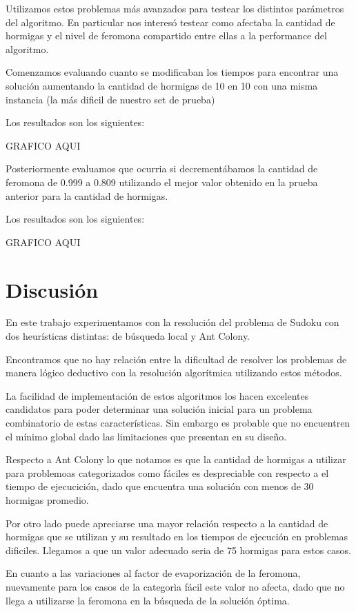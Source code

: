 \documentclass[a4paper,spanish]{article}
\begin{document}
Utilizamos estos problemas más avanzados para testear los distintos parámetros del algoritmo. En particular
nos interesó testear como afectaba la cantidad de hormigas y el nivel de feromona compartido entre ellas
a la performance del algoritmo.

Comenzamos evaluando cuanto se modificaban los tiempos para encontrar una solución aumentando 
la cantidad de hormigas de 10 en 10 con una misma instancia (la más dificil de nuestro set de prueba)

Los resultados son los siguientes:

GRAFICO AQUI

Posteriormente evaluamos que ocurria si decrementábamos la cantidad de feromona de 0.999 a 0.809 utilizando
el mejor valor obtenido en la prueba anterior para la cantidad de hormigas.

Los resultados son los siguientes:

GRAFICO AQUI


\section{Discusión}

En este trabajo experimentamos con la resolución del problema de Sudoku con dos
heurísticas distintas: de búsqueda local y Ant Colony.


Encontramos que no hay relación entre la dificultad de resolver los problemas de
manera lógico deductivo con la resolución algorítmica utilizando estos métodos.

La facilidad de implementación de estos algoritmos los hacen excelentes
candidatos para poder determinar una solución inicial para un problema
combinatorio de estas características. Sin embargo es probable que no encuentren
el mínimo global dado las limitaciones que presentan en su diseño.


Respecto a Ant Colony lo que notamos es que la cantidad de hormigas a utilizar para problemoas categorizados como
fáciles es despreciable con respecto a el tiempo de ejecucición, dado que encuentra una solución con
menos de 30 hormigas promedio.

Por otro lado puede apreciarse una mayor relación respecto a la cantidad de hormigas que se 
utilizan y su resultado en los tiempos de ejecución en problemas dificiles. Llegamos a que un valor
adecuado seria de 75 hormigas para estos casos.

En cuanto a las variaciones al factor de evaporización de la feromona, nuevamente para los casos de la categorìa fácil
este valor no afecta, dado que no llega a utilizarse la feromona en la búsqueda de la solución óptima.
\end{document}
